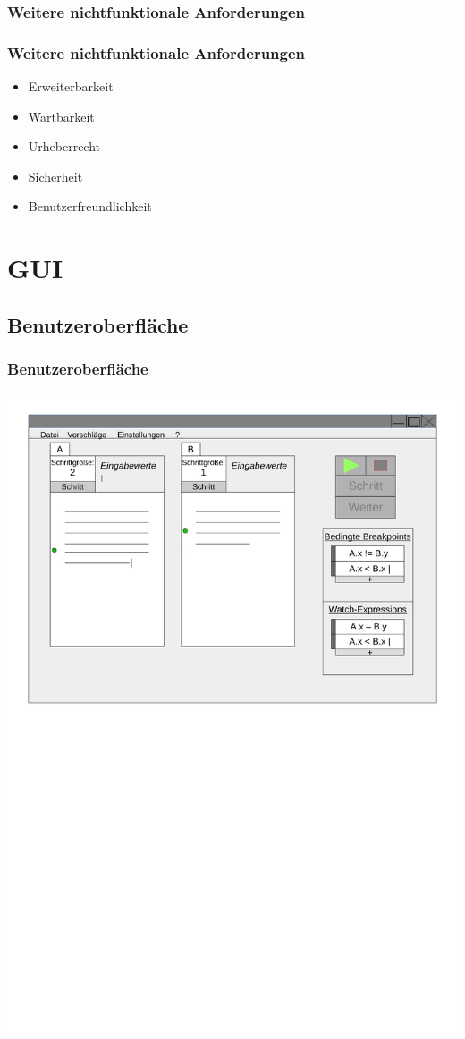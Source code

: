 \documentclass{beamer}
\begin{document}
\subsubsection{Weitere nichtfunktionale Anforderungen}
\begin{frame}
\frametitle{Weitere nichtfunktionale Anforderungen}
\begin{itemize}
\item Erweiterbarkeit
\item Wartbarkeit
\item Urheberrecht
\item Sicherheit
\item Benutzerfreundlichkeit
\end{itemize}
\end{frame}


\section{GUI}
\subsection{Benutzeroberfläche}
\begin{frame}
\frametitle{Benutzeroberfläche}
\includegraphics[scale=0.45]{../skizzeEdit}
\end{frame}
\end{document}
